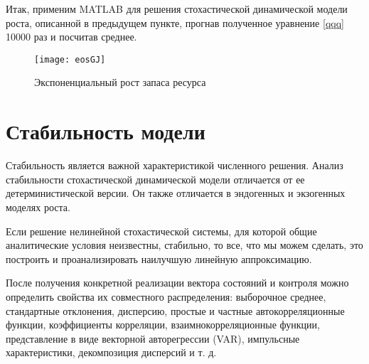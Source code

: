 \documentclass[12pt,a4paper, oneside]{extreport}
\begin{document}
Итак, применим  MATLAB   для решения стохастической динамической модели роста, описанной  в предыдущем пункте,  прогнав полученное уравнение \eqref{qqq} 10000 раз и посчитав среднее.



\begin{figure}[h!]
	\centering
	\texttt{[image: eosGJ]}
	\caption{Экспоненциальный рост запаса ресурса}
	\label{fig:eosgj}
\end{figure}










\section{Стабильность модели}

Стабильность является важной характеристикой численного решения. Анализ стабильности  стохастической динамической модели отличается от  ее детерминистической  версии. Он также отличается в  эндогенных  и экзогенных моделях роста.

Если решение  нелинейной  стохастической системы, для которой общие аналитические условия неизвестны, стабильно, то  все, что мы можем сделать, это построить и проанализировать  наилучшую линейную аппроксимацию. 

После получения конкретной   реализации  вектора состояний и контроля можно  определить  свойства их совместного распределения: выборочное среднее, стандартные отклонения, дисперсию, простые и частные автокорреляционные функции, коэффициенты корреляции, взаимнокорреляционные функции,  представление в виде векторной авторегрессии (VAR), импульсные характеристики, декомпозиция дисперсий и т. д. 
\end{document}
